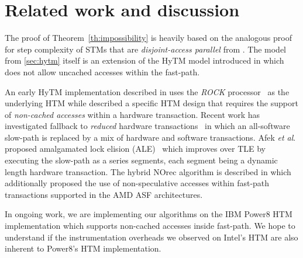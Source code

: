 \section{Related work and discussion}
\label{sec:rel}
%
The proof of Theorem~\ref{th:impossibility} is heavily based on the analogous proof for step complexity of
STMs that are \emph{disjoint-access parallel} from \cite{prog15-pact}.
The model from \cref{sec:hytm} itself is an extension of the HyTM model introduced in \cite{hytm14disc}
which does not allow uncached accesses within the fast-path.

An early HyTM implementation described in \cite{damronhytm} uses the \emph{ROCK} processor~\cite{rock} as the underlying HTM
while \cite{kumarhytm} described a specific HTM design that requires the support of \emph{non-cached accesses}
within a hardware transaction. 
Recent work has investigated fallback to \emph{reduced} hardware transactions~\cite{MS13}
in which an all-software slow-path is replaced by a mix of hardware and software transactions. 
Afek \emph{et al}. proposed amalgamated lock elision (ALE)~\cite{ale15} which improves over TLE
by executing the slow-path as a series segments, each segment being a dynamic length hardware transaction.
The hybrid NOrec algorithm is described in \cite{hynorecriegel} which additionally proposed the use of non-speculative accesses
within fast-path transactions supported in the AMD ASF architectures.

In ongoing work, we are implementing our algorithms on the IBM Power8 HTM implementation which supports
non-cached accesses inside fast-path. We hope to understand if the instrumentation overheads we observed
on Intel's HTM are also inherent to Power8's HTM implementation.